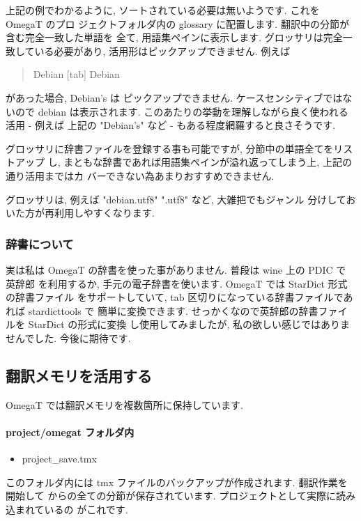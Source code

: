 \documentclass[mingoth,a4paper]{jsarticle}
\begin{document}
上記の例でわかるように, ソートされている必要は無いようです. これを OmegaT のプロ
ジェクトフォルダ内の glossary に配置します. 翻訳中の分節が含む完全一致した単語を
全て, 用語集ペインに表示します. 
グロッサリは完全一致している必要があり, 活用形はピックアップできません. 
例えば
\begin{quote}
Debian [tab] Debian
\end{quote}
があった場合, Debian's は ピックアップできません. ケースセンシティブではないので
debian は表示されます. このあたりの挙動を理解しながら良く使われる活用 - 例えば
上記の "Debian's" など - もある程度網羅すると良さそうです. 

グロッサリに辞書ファイルを登録する事も可能ですが, 分節中の単語全てをリストアップ
し, まともな辞書であれば用語集ペインが溢れ返ってしまう上, 上記の通り活用まではカ
バーできない為あまりおすすめできません. 

グロッサリは, 例えば "debian.utf8" ".utf8" など, 大雑把でもジャンル
分けしておいた方が再利用しやすくなります.


\subsubsection{辞書について}
実は私は OmegaT の辞書を使った事がありません. 普段は wine 上の PDIC で 英辞郎
を利用するか, 手元の電子辞書を使います. OmegaT では StarDict 形式の辞書ファイル
をサポートしていて, tab 区切りになっている辞書ファイルであれば stardicttools で
簡単に変換できます. せっかくなので英辞郎の辞書ファイルを StarDict の形式に変換
し使用してみましたが, 私の欲しい感じではありませんでした. 今後に期待です.

\subsection{翻訳メモリを活用する}
OmegaT では翻訳メモリを複数箇所に保持しています.

\paragraph{project/omegat フォルダ内}
\begin{itemize}
	\item{project\_save.tmx}
\end{itemize}
このフォルダ内には tmx ファイルのバックアップが作成されます. 翻訳作業を開始して
からの全ての分節が保存されています. プロジェクトとして実際に読み込まれているの
がこれです.
\end{document}
